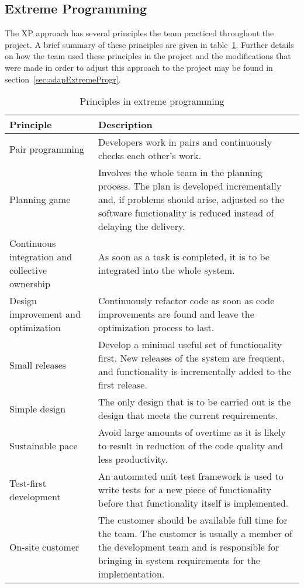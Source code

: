 \subsection{Extreme Programming}
The XP approach has several principles the team practiced throughout the project. A brief summary of these principles are given in table~\ref{tab:exProg}. Further details on how the team used these principles in the project and the modifications that were made in order to adjust this approach to the project may be found in section~\ref{sec:adapExtremeProgr}.

\begin{table}[H]
\begin{tabular}{|p{4cm}|p{11.7cm}|}
\hline
\textbf{Principle} & \textbf{Description} \\\hline
Pair programming & Developers work in pairs and continuously checks each other's work.\\\hline
Planning game & Involves the whole team in the planning process. The plan is developed incrementally and, if problems should arise, adjusted so the software functionality is reduced instead of delaying the delivery.
\\\hline
Continuous integration and collective ownership& As soon as a task is completed, it is to be integrated into the whole system.\\\hline
Design improvement and optimization & Continuously refactor code as soon as code improvements are found and leave the optimization process to last. \\\hline
Small releases & Develop a minimal useful set of functionality first. New releases of the system are frequent, and functionality is incrementally added to the first release.\\\hline
Simple design & The only design that is to be carried out is the design that meets the current requirements.\\\hline
Sustainable pace & Avoid large amounts of overtime as it is likely to result in reduction of the code quality and less productivity. \\\hline
Test-first development & An automated unit test framework is used to write tests for a new piece of functionality before that functionality itself is implemented. \\\hline
On-site customer & The customer should be available full time for the team. The customer is usually a member of the development team and is responsible for bringing in system requirements for the implementation.\\\hline
\end{tabular}
\caption{Principles in extreme programming}
\label{tab:exProg}
\end{table}
